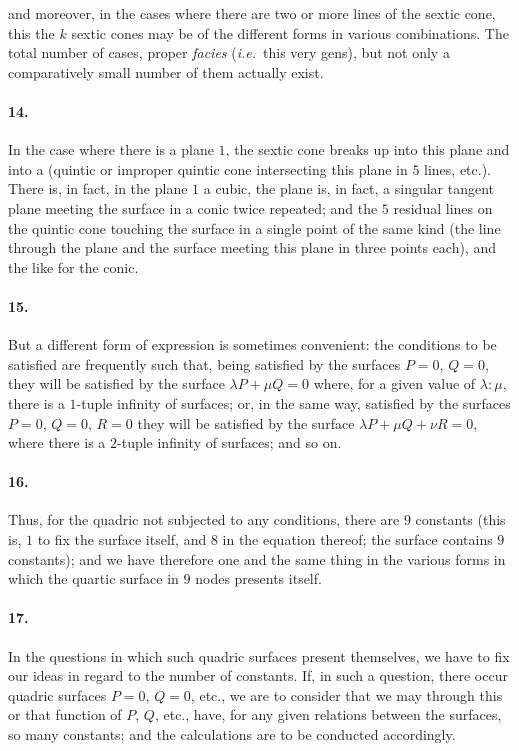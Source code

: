 \documentclass[11pt,a4paper]{article}
\begin{document}
\noindent and moreover, in the cases where there are two or more lines of the sextic cone,
this the $k$ sextic cones may be of the different forms in various combinations. The
total number of cases, proper \emph{facies} (\emph{i.e.}\ this very gens), but not only a
comparatively small number of them actually exist.

\paragraph{14.}
In the case where there is a plane $1$, the sextic cone breaks up into this plane and
into a (quintic or improper quintic cone intersecting this plane in $5$ lines, etc.).
There is, in fact, in the plane $1$ a cubic, the plane is, in fact, a singular tangent
plane meeting the surface in a conic twice repeated; and the $5$ residual lines on the
quintic cone touching the surface in a single point of the same kind (the line through
the plane and the surface meeting this plane in three points each), and the like for
the conic.

\paragraph{15.}
But a different form of expression is sometimes convenient: the conditions to be
satisfied are frequently such that, being satisfied by the surfaces $P = 0$, $Q = 0$,
they will be satisfied by the surface $\lambda P + \mu Q = 0$ where, for a given
value of $\lambda : \mu$, there is a $1$-tuple infinity of surfaces; or, in the same way,
satisfied by the surfaces $P = 0$, $Q = 0$, $R = 0$ they will be satisfied by the surface
$\lambda P + \mu Q + \nu R = 0$, where there is a $2$-tuple infinity of surfaces; and so on.

\paragraph{16.}
Thus, for the quadric not subjected to any conditions, there are $9$ constants
(this is, $1$ to fix the surface itself, and $8$ in the equation thereof; the surface
contains $9$ constants); and we have therefore one and the same thing in the various
forms in which the quartic surface in $9$ nodes presents itself.

\paragraph{17.}
In the questions in which such quadric surfaces present themselves, we have to fix our
ideas in regard to the number of constants. If, in such a question, there occur quadric
surfaces $P = 0$, $Q = 0$, etc., we are to consider that we may through this or that
function of $P$, $Q$, etc., have, for any given relations between the surfaces, so many
constants; and the calculations are to be conducted accordingly.
\end{document}
